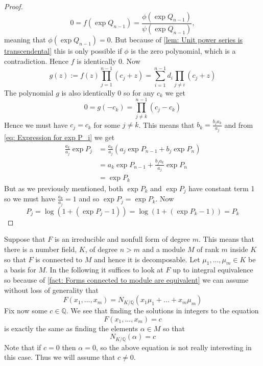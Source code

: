\documentclass{article}
\newcommand{\mbb}[1]{\mathbb{#1}}
\numberwithin{equation}{section}
\begin{document}
\begin{proof}
    $$0 = f(\exp Q_{n-1}) = \frac{\phi(\exp Q_{n-1})}{\psi(\exp Q_{n-1})},$$
    meaning that $\phi(\exp Q_{n-1}) = 0$. But because of \cref{lem: Unit power series is transcendental} this is only possible if $\phi$ is the zero polynomial, which is a contradiction. Hence $f$ is identically 0. Now
    $$g(z) := f(z) \prod_{j=1}^{n-1}(c_j + z)  = \sum_{i = 1}^{n-1}d_i\prod_{j \neq i}(c_j + z)$$
    The polynomial $g$ is also identically 0 so for any $c_k$ we get $$0 = g(-c_k) = \prod_{j \neq k}^{n-1} (c_j - c_k)$$
    Hence we must have $c_j = c_k$ for some $j \neq k$. This means that $b_k = \frac{b_j a_k}{a_j}$ and from \cref{eq: Expression for exp P_i} we get
    \begin{align*}
        \frac{a_k}{a_j}\exp P_j & = \frac{a_k}{a_j}(a_j \exp P_{n-1} + b_j \exp P_n) \\
                                & = a_k \exp P_{n-1} + \frac{b_j a_k}{a_j} \exp P_n  \\
                                & = \exp P_k
    \end{align*}
    But as we previously mentioned, both $\exp P_k$ and $\exp P_j$ have constant term 1 so we must have $\frac{a_k}{a_j} = 1$ and so $\exp P_j = \exp P_k$. Now
    $$P_j = \log(1 + (\exp P_j - 1)) = \log(1 + (\exp P_k - 1)) = P_k$$
\end{proof}


Suppose that $F$ is an irreducible and nonfull form of degree $m$. This means that there is a number field, $K$, of degree $n > m$ and a module $M$ of rank $m$ inside $K$ so that $F$ is connected to $M$ and hence it is decomposable. Let $\mu_1, ..., \mu_m \in K$ be a basis for $M$. In the following it suffices to look at $F$ up to integral equivalence so because of \cref{fact: Forms connected to module are equivalent} we can assume without loss of generality that
\begin{equation*}
    F(x_1, ..., x_m) = N_{K / \mbb Q}(x_1 \mu_1 + ... + x_m \mu_m)
\end{equation*}
Fix now some $c \in \mbb Q$. We see that finding the solutions in integers to the equation
\begin{equation}\label{eq: Initial equation of interest}
    F(x_1, ..., x_m) = c
\end{equation}
is exactly the same as finding the elements $\alpha \in M$ so that
\begin{equation}
    N_{K / \mbb Q}(\alpha) = c
\end{equation}
Note that if $c = 0$ then $\alpha = 0$, so the above equation is not really interesting in this case. Thus we will assume that $c \neq 0$.
\end{document}
